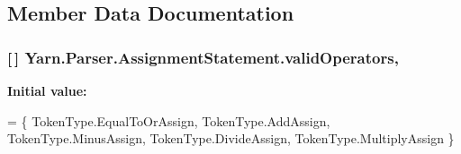 \subsection{Member Data Documentation}
\hypertarget{a00033_af3d393da2f684272251805d3471b6c7a}{
\subsubsection[{valid\-Operators}]{ \mbox{[}$\,$\mbox{]} Yarn.\-Parser.\-Assignment\-Statement.\-valid\-Operators\hspace{0.3cm}{\ttfamily [static]}, {\ttfamily [private]}}}\label{a00033_af3d393da2f684272251805d3471b6c7a}
{\bfseries Initial value\-:}
\begin{DoxyCode}
= \{
                TokenType.EqualToOrAssign,
                TokenType.AddAssign,
                TokenType.MinusAssign,
                TokenType.DivideAssign,
                TokenType.MultiplyAssign
            \}
\end{DoxyCode}


